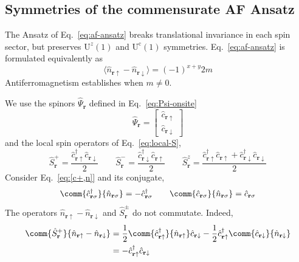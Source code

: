 \subsection{Symmetries of the commensurate AF Ansatz}

The Ansatz of Eq.~\eqref{eq:af-ansatz} breaks translational invariance in each spin sector, but preserves $\mathrm{U}^z(1)$ and $\mathrm{U}^\mathrm{c}(1)$ symmetries. Eq.~\eqref{eq:af-ansatz} is formulated equivalently as
\begin{equation}\label{eq:af-ansatz-2m}
	\langle \hat n_{\mathbf{r}\uparrow} - \hat n_{\mathbf{r}\downarrow} \rangle = (-1)^{x+y} 2m
\end{equation}
Antiferromagnetism establishes when $m \neq 0$.

\begin{tabproof}
	We use the spinors $\hat \Psi_\mathbf{r}$ defined in Eq.~\eqref{eq:Psi-onsite} 
	\[
	\hat \Psi_\mathbf{r} = \begin{bmatrix}
		\hat c_{\mathbf{r}\uparrow} \\ \hat c_{\mathbf{r}\downarrow}
	\end{bmatrix}
	\]
	and the local spin operators of Eq.~\eqref{eq:local-S},
	\[
	\hat S_\mathbf{r}^+ = \frac{\hat c_{\mathbf{r}\uparrow}^\dagger \hat c_{\mathbf{r}\downarrow}}{2}
	\qquad
	\hat S_\mathbf{r}^- = \frac{\hat c_{\mathbf{r}\downarrow}^\dagger \hat c_{\mathbf{r}\uparrow}}{2}
	\qquad
	\hat S_\mathbf{r}^z = \frac{\hat c_{\mathbf{r}\uparrow}^\dagger \hat c_{\mathbf{r}\uparrow} + \hat c_{\mathbf{r}\downarrow}^\dagger \hat c_{\mathbf{r}\downarrow}}{2}
	\]
	Consider Eq.~\eqref{eq:[c+,n]} and its conjugate,
	\[
	\comm{\hat c_{\mathbf{r}\sigma}^\dagger}{\hat n_{\mathbf{r}\sigma}} = -\hat c_{\mathbf{r}\sigma}^\dagger
	\qquad
	\comm{\hat c_{\mathbf{r}\sigma}}{\hat n_{\mathbf{r}\sigma}} = \hat c_{\mathbf{r}\sigma}
	\]
	The operators $\hat n_{\mathbf{r}\uparrow} - \hat n_{\mathbf{r}\downarrow}$ and $\hat S_\mathbf{r}^\pm$ do not commutate. Indeed,
	\[
	\begin{aligned}
		\comm{\hat S_\mathbf{r}^+}{\hat n_{\mathbf{r}\uparrow} - \hat n_{\mathbf{r}\downarrow}} &= \frac{1}{2} \comm{\hat c_{\mathbf{r}\uparrow}^\dagger}{\hat n_{\mathbf{r}\uparrow}} \hat c_{\mathbf{r}\downarrow} - \frac{1}{2} \hat c_{\mathbf{r}\uparrow}^\dagger \comm{\hat c_{\mathbf{r}\downarrow}}{\hat n_{\mathbf{r}\downarrow}} \\
		&= - \hat c_{\mathbf{r}\uparrow}^\dagger \hat c_{\mathbf{r}\downarrow} \\[0.5em]

\end{aligned}\]
\end{tabproof}
